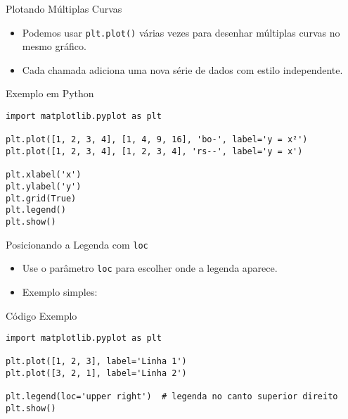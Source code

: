\begin{frame}[fragile]{Plotando Múltiplas Curvas}
    \begin{itemize}
        \item Podemos usar \texttt{plt.plot()} várias vezes para desenhar múltiplas curvas no mesmo gráfico.
        \item Cada chamada adiciona uma nova série de dados com estilo independente.
    \end{itemize}

    \begin{block}{Exemplo em Python}
\begin{verbatim}
import matplotlib.pyplot as plt

plt.plot([1, 2, 3, 4], [1, 4, 9, 16], 'bo-', label='y = x²')
plt.plot([1, 2, 3, 4], [1, 2, 3, 4], 'rs--', label='y = x')

plt.xlabel('x')
plt.ylabel('y')
plt.grid(True)
plt.legend()
plt.show()
\end{verbatim}
    \end{block}
\end{frame}

\begin{frame}[fragile]{Posicionando a Legenda com \texttt{loc}}
    \begin{itemize}
        \item Use o parâmetro \texttt{loc} para escolher onde a legenda aparece.
        \item Exemplo simples:
    \end{itemize}

    \begin{block}{Código Exemplo}
\begin{verbatim}
import matplotlib.pyplot as plt

plt.plot([1, 2, 3], label='Linha 1')
plt.plot([3, 2, 1], label='Linha 2')

plt.legend(loc='upper right')  # legenda no canto superior direito
plt.show()
\end{verbatim}
    \end{block}
\end{frame}

